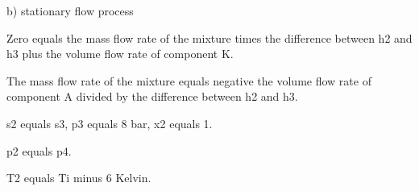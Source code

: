b) stationary flow process

Zero equals the mass flow rate of the mixture times the difference between h2 and h3 plus the volume flow rate of component K.

The mass flow rate of the mixture equals negative the volume flow rate of component A divided by the difference between h2 and h3.

s2 equals s3, p3 equals 8 bar, x2 equals 1.

p2 equals p4.

T2 equals Ti minus 6 Kelvin.